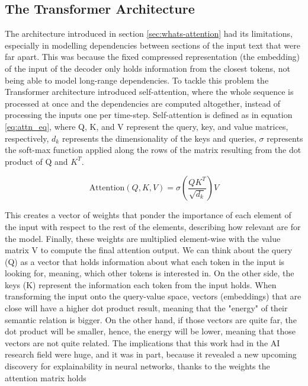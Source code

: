 \subsection{The Transformer Architecture}
\label{sec:transformer}

The architecture introduced in section \ref{sec:whats-attention} had its limitations, especially in modelling dependencies between sections of the input text that were far apart. This was because the fixed compressed representation (the embedding) of the input of the decoder only holds information from the closest tokens, not being able to model long-range dependencies. To tackle this problem the Transformer architecture  \cite{vaswani2023attention} introduced self-attention, where the whole sequence is processed at once and the dependencies are computed altogether, instead of processing the inputs one per time-step. Self-attention is defined as in equation \ref{eq:attn_eq}, where Q, K, and V represent the query, key, and value matrices, respectively, $d_k$ represents the dimensionality of the keys and queries, $\sigma$ represents the soft-max function applied along the rows of the matrix resulting from the dot product of Q and $K^T$. 

\begin{equation} \label{eq:attn_eq}
	\text{Attention}(Q,K,V) = \text{$\sigma$}\left(\frac{QK^T}{\sqrt{d_k}}\right)V
\end{equation}

This creates a vector of weights that ponder the importance of each element of the input with respect to the rest of the elements, describing how relevant are for the model. Finally, these weights are multiplied element-wise with the value matrix V to compute the final attention output. We can think about the query (Q) as a vector that holds information about what each token in the input is looking for, meaning, which other tokens is interested in. On the other side, the keys (K) represent the information each token from the input holds. When transforming the input onto the query-value space, vectors (embeddings) that are close will have a higher dot product result, meaning that the "energy" of their semantic relation is bigger. On the other hand, if those vectors are quite far, the dot product will be smaller, hence, the energy will be lower, meaning that those vectors are not quite related. The implications that this work had in the AI research field were huge, and it was in part, because it revealed a new upcoming discovery for explainability in neural networks, thanks to the weights the attention matrix holds

